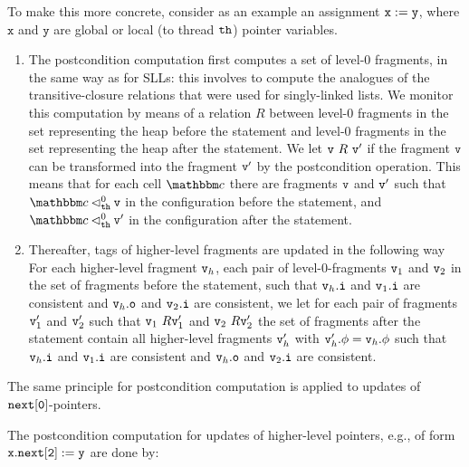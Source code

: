 To make this more concrete, consider as an example an assignment
${\tt x := y}$, where $\mathtt{x}$ and $\mathtt{y}$ are global or local
(to thread ${\tt th}$) pointer variables.
\begin{enumerate}
  \item
The postcondition computation first computes a set of level-$0$ fragments,
in the same way as for SLLs: this involves to compute
the analogues of the transitive-closure relations that were used
for singly-linked lists. We monitor this computation by means of a relation
$R$ between level-$0$ fragments  in the set representing the heap before the
statement and level-$0$ fragments in the set representing the heap after the
statement. We let $\mathtt{v} \ R \ \mathtt{v}'$ if the fragment $\mathtt{v}$ can be
transformed into the fragment $\mathtt{v}'$ by the postcondition operation.
This means that for each cell $\cell$ there are fragments $\mathtt{v}$ and $\mathtt{v}'$
such that $\cell \satslfrag{\thread}{0} \frag$ in the configuration before
the statement, and $\cell \satslfrag{\thread}{0} \frag'$ in the configuration
after the statement.
\item
  Thereafter, tags of higher-level fragments are updated in the following way
  For each higher-level fragment $\mathtt{v}_h$, each pair of
  level-$0$-fragments $\mathtt{v}_1$ and $\mathtt{v}_2$ in the set of fragments
  before the statement, such that
  $\mathtt{v}_h.\mathtt{i}$ and $\mathtt{v}_1.\mathtt{i}$ are consistent and
  $\mathtt{v}_h.\mathtt{o}$ and $\mathtt{v}_2.\mathtt{i}$ are consistent, we let for
  each pair of fragments $\mathtt{v}_1'$ and $\mathtt{v}_2'$ such that
  $\mathtt{v}_1 \ R \mathtt{v}_1'$ and $\mathtt{v}_2 \ R \mathtt{v}_2'$ the set of fragments
  after the statement contain all higher-level fragments
  $\mathtt{v}_h'$ with $\mathtt{v}_h'.\phi = \mathtt{v}_h.\phi$ such that
  $\mathtt{v}_h.\mathtt{i}$ and $\mathtt{v}_1.\mathtt{i}$ are consistent and
  $\mathtt{v}_h.\mathtt{o}$ and $\mathtt{v}_2.\mathtt{i}$ are consistent.
\end{enumerate}
The same principle for postcondition computation is applied to updates of
$\tt next[0]$-pointers.

The postcondition computation for updates of higher-level pointers, e.g.,
of form $\tt x.next[2] := y$ are done by:


  




%
